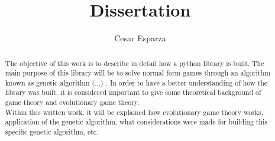 \documentclass{article}
\title{Dissertation}
\author{Cesar Esparza}
\begin{document}
\maketitle
\begin{abstract}
The objective of this work is to describe in detail how a python library is built. The main purpose of this library will be to solve normal form games through an algorithm known as genetic algorithm (...) . In order to have a better understanding of how the library was built, it is considered important to give some theoretical background of game theory and evolutionary game theory.
\\Within this written work, it will be explained how evolutionary game theory works, application of the genetic algorithm, what considerations were made for building this specific genetic algorithm, etc.

\end{abstract}


\newpage
\end{document}

